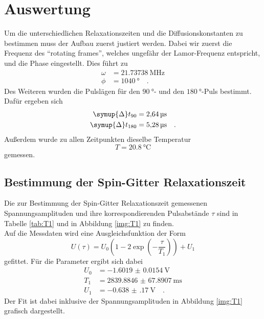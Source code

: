 \newpage 
\section{Auswertung}

\noindent
Um die unterschiedlichen Relaxationszeiten und die Diffusionskonstanten zu bestimmen muss der Aufbau zuerst justiert werden. 
Dabei wir zuerst die Frequenz des \enquote{rotating frames}, welches ungefähr der Lamor-Frequenz entspricht, und die Phase eingestellt. Dies führt zu 
\begin{align*}
  \omega &= \SI{21.73738}{\mega\hertz}\\
  \phi &= \SI{1040}{\degree} \quad .
\end{align*}
Des Weiteren wurden die Pulslägen für den $\SI{90}{\degree}$- und den $\SI{180}{\degree}$-Puls bestimmt. Dafür ergeben sich
\begin{align*}
  \symup{\Delta} t_{90} &= \SI{2.64}{\micro\second}\\
  \symup{\Delta} t_{180} &= \SI{5.28}{\micro\second} \quad .
\end{align*}
Außerdem wurde zu allen Zeitpunkten dieselbe Temperatur 
\begin{equation*}
  T = \SI{20.8}{\degreeCelsius}
\end{equation*}
gemessen.


\subsection{Bestimmung der Spin-Gitter Relaxationszeit}

\noindent
Die zur Bestimmung der Spin-Gitter Relaxationszeit gemessenen Spannungsamplituden und ihre korrespondierenden Pulsabstände $\tau$ sind in Tabelle \ref{tab:T1} und in Abbildung \ref{img:T1} zu finden.\\
Auf die Messdaten wird eine Ausgleichsfunktion der Form 
\begin{equation*}
  U\left(\tau\right) = U_0 \left(1-2\exp{\left(-\frac{\tau}{T_1}\right)}\right) + U_1
\end{equation*}
gefittet. Für die Parameter ergibt sich dabei
\begin{align*}
  U_0 &= \SI{-1.6019(154)}{\volt}\\
  T_1 &= \SI{2839.8846(678907)}{\milli\second}\\
  U_1 &= \SI{-0.638(170)}{\volt} \quad .
\end{align*}
Der Fit ist dabei inklusive der Spannungsamplituden in Abbildung \ref{img:T1} grafisch dargestellt.

